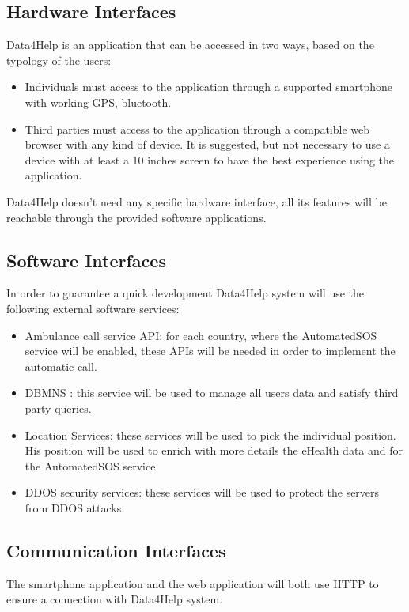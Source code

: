\subsection{Hardware Interfaces}
Data4Help is an application that can be accessed in two ways, based on the typology of the users:
\begin{itemize}
\item Individuals must access to the application through a supported smartphone with working GPS, bluetooth.
\item Third parties must access to the application through a compatible web browser with any kind of device. It is suggested, but not necessary to use a device with at least a 10 inches screen to have the best experience using the application.
\end{itemize}
Data4Help doesn't need any specific hardware interface, all its features will be reachable through the provided software applications.








\subsection{Software Interfaces}
In order to guarantee a quick development Data4Help system will use the following external software services:
\begin{itemize}
\item Ambulance call service API: for each country, where the AutomatedSOS service will be enabled, these APIs will be needed in order to implement the automatic call.
\item DBMNS : this service will be used to manage all users data and satisfy third party queries.
\item Location Services: these services will be used to pick the individual position. His position will be used to enrich with more details the eHealth data and for the AutomatedSOS service.
\item DDOS security services: these services will be used to protect the servers from DDOS attacks.
\end{itemize}

\subsection{Communication Interfaces}
The smartphone application and the web application will both use HTTP to ensure a connection with Data4Help system.

